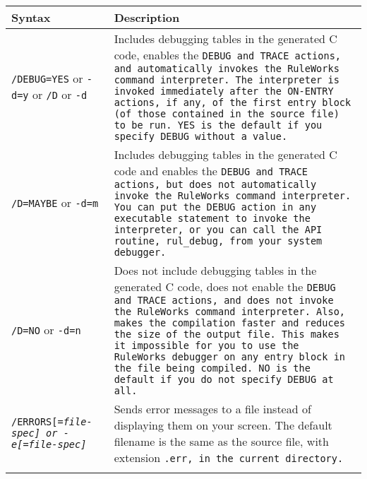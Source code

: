 \begin{longtable}{p{5cm}p{10cm}}
  \toprule
  Syntax & Description \\
  \midrule
  \verb|/DEBUG=YES| or \verb|-d=y| or \verb|/D| or \verb|-d|
         &
           Includes debugging tables in the generated C code,
           enables the \tt{DEBUG} and    
           \tt{TRACE} actions, and
           automatically invokes the
           RuleWorks command
           interpreter. The        
           interpreter is invoked   
           immediately after the    
           \tt{ON-ENTRY} actions, if any,
           of the first entry block
           (of those contained in   
           the source file) to be 
           run.                     
           \tt{YES} is the default if you 
           specify \tt{DEBUG} without a   
           value. \\\addlinespace
  \raggedright
  \verb|/D=MAYBE| or \verb|-d=m| 
         &
           Includes debugging tables
           in the generated C code 
           and enables the \tt{DEBUG} and
           \tt{TRACE} actions, but does
           not automatically invoke
           the RuleWorks command
           interpreter. You can put
           the \tt{DEBUG} action in any
           executable statement to  
           invoke the interpreter, 
           or you can call the API
           routine, \verb|rul_debug|, from
           your system debugger. \\\addlinespace
  \raggedright
  \verb|/D=NO| or \verb|-d=n|
         &
           Does not include
           debugging tables in the 
           generated C code, does 
           not enable the \tt{DEBUG} and 
           \tt{TRACE} actions, and does 
           not invoke the RuleWorks 
           command interpreter. 
           Also, makes the 
           compilation faster and 
           reduces the size of the 
           output file. 
           This makes it impossible 
           for you to use the 
           RuleWorks debugger on any 
           entry block in the file 
           being compiled. 
           \tt{NO} is the default if you 
           do not specify \tt{DEBUG} at 
           all. \\\addlinespace
  \raggedright
  \tt{/ERRORS}[\tt=\it{file-spec}] or \tt{-e}[\tt=\it{file-spec}] 
         &
           Sends error messages to a
           file instead of 
           displaying them on your 
           screen. The default 
           filename is the same as 
           the source file, with 
           extension \tt{.err}, in the 
           current directory. \\\addlinespace 

\end{longtable}
